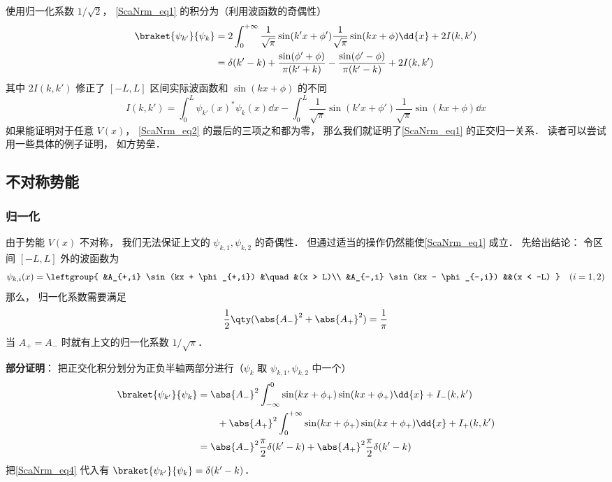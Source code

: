使用归一化系数 $1/\sqrt{2}$， \autoref{ScaNrm_eq1} 的积分为（利用波函数的奇偶性）
\begin{equation}\label{ScaNrm_eq2}
\begin{aligned}
\braket{\psi_{k'}}{\psi_k} &= 2\int_{0}^{+\infty} \frac{1}{\sqrt{\pi}}\sin(k'x+\phi')\frac{1}{\sqrt{\pi}}\sin(kx+\phi) \dd{x} + 2I(k,k')\\
&= \delta(k'-k) + \frac{\sin(\phi'+\phi)}{\pi(k'+k)} - \frac{\sin(\phi'-\phi)}{\pi(k'-k)} + 2I(k,k')
\end{aligned}
\end{equation}
其中 $2I(k,k')$ 修正了 $[-L,L]$ 区间实际波函数和 $\sin(kx+\phi)$ 的不同
\begin{equation}
I(k,k') = \int_0^L \psi_{k'}(x)^* \psi_k(x) \dd{x}
-\int_{0}^{L} \frac{1}{\sqrt{\pi}}\sin(k'x+\phi') \frac{1}{\sqrt{\pi}}\sin(kx+\phi) \dd{x}
\end{equation}
如果能证明对于任意 $V(x)$， \autoref{ScaNrm_eq2} 的最后的三项之和都为零， 那么我们就证明了\autoref{ScaNrm_eq1} 的正交归一关系． 读者可以尝试用一些具体的例子证明， 如方势垒．

\subsection{不对称势能}
\subsubsection{归一化}
由于势能 $V(x)$ 不对称， 我们无法保证上文的 $\psi_{k,1},\psi_{k,2}$ 的奇偶性． 但通过适当的操作仍然能使\autoref{ScaNrm_eq1} 成立． 先给出结论： 令区间 $[-L,L]$ 外的波函数为
\begin{equation}
\psi_{k,i}(x) = \leftgroup{
    &A_{+,i} \sin(kx + \phi_{+,i}) &\quad &(x > L)\\
    &A_{-,i} \sin(kx - \phi_{-,i}) &&(x < -L)
} \quad (i = 1,2)
\end{equation}
那么， 归一化系数需要满足
\begin{equation}\label{ScaNrm_eq4}
\frac{1}{2}\qty(\abs{A_-}^2 + \abs{A_+}^2) = \frac{1}{\pi}
\end{equation}
当 $A_+ = A_-$ 时就有上文的归一化系数 $1/\sqrt{\pi}$．

\textbf{部分证明}： 把正交化积分划分为正负半轴两部分进行（$\psi_{k}$ 取 $\psi_{k,1}, \psi_{k,2}$ 中一个）
\begin{equation}
\begin{aligned}
\braket{\psi_{k'}}{\psi_{k}} &= \abs{A_-}^2\int_{-\infty}^0 \sin(kx + \phi_{+})\sin(kx + \phi_{+}) \dd{x} + I_-(k,k')\\
&\qquad+ \abs{A_+}^2\int_0^{+\infty} \sin(kx + \phi_{+})\sin(kx + \phi_{+}) \dd{x}   + I_+(k,k')\\
&= \abs{A_-}^2\frac{\pi}{2}\delta(k'-k) + \abs{A_+}^2 \frac{\pi}{2} \delta(k'-k)
\end{aligned}
\end{equation}
把\autoref{ScaNrm_eq4} 代入有 $\braket{\psi_{k'}}{\psi_{k}} = \delta(k'-k)$．

